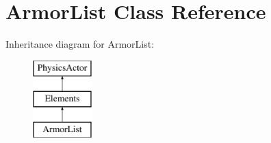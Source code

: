 \hypertarget{class_armor_list}{\section{Armor\+List Class Reference}
\label{class_armor_list}
}
Inheritance diagram for Armor\+List\+:\begin{figure}[H]
\begin{center}
\leavevmode
\includegraphics[height=3.000000cm]{class_armor_list}
\end{center}
\end{figure}
